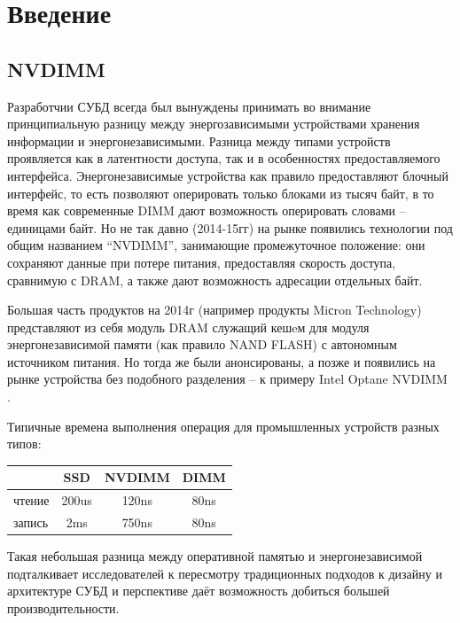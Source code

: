 \documentclass[pdftex,ptm,12pt,a4paper]{report}
\theoremstyle{definition}
\begin{document}
\tableofcontents
\sloppy

\parindent=1.25cm

\chapter{Введение}
\section{NVDIMM}
Разработчии СУБД всегда был вынуждены принимать во внимание принципиальную разницу между энергозависимыми устройствами хранения информации и энергонезависимыми.
Разница между типами устройств проявляется как в латентности доступа, так и в особенностях предоставляемого интерфейса.
Энергонезависимые устройства как правило предоставляют блочный интерфейс, то есть
позволяют оперировать только блоками из тысяч байт, в то время как современные DIMM дают возможность оперировать словами -- единицами байт.
Но не так давно (2014-15гг) на рынке появились технологии под общим названием “NVDIMM”, занимающие промежуточное положение: они сохраняют данные при потере питания,
предоставляя скорость доступа, сравнимую с DRAM, а также дают возможность адресации отдельных байт.

Большая часть продуктов на 2014г (например продукты Miсron Technology) представляют из себя модуль DRAM служащий кешeм для модуля энергонезависимой памяти (как правило NAND FLASH)
с автономным источником питания. Но тогда же были анонсированы, а позже и появились на рынке устройства без подобного разделения -- к примеру Intel Optane NVDIMM \cite{peng2019system}.

Типичные времена выполнения операция для промышленных устройств разных типов:
\begin{center}
\begin{tabular} {|l| c c c|}
\hline
    & SSD & NVDIMM & DIMM \\
    \hline
чтение & 200us & 120ns & 80ns \\
запись & 2ms & 750ns & 80ns \\
\hline
\end{tabular}
\end{center}

Такая небольшая разница между оперативной памятью и энергонезависимой подталкивает исследователей к пересмотру традиционных подходов к дизайну и архитектуре СУБД и перспективе даёт возможность добиться большей производительности.
\end{document}
